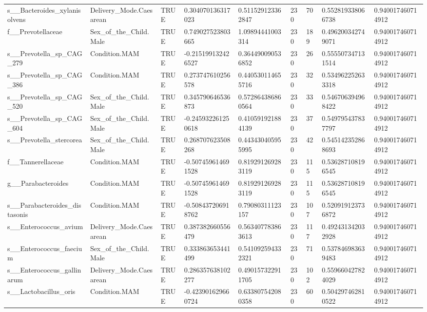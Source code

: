 \begin{longtable}{lllllllll}
s\_\_Bacteroides\_xylanisolvens & Delivery\_Mode.Caesarean & TRUE & 0.304070136317023 & 0.511529123362847 & 230 & 70 & 0.552819338066738 & 0.940017460714912 \\
f\_\_Prevotellaceae & Sex\_of\_the\_Child.Male & TRUE & 0.749027523803665 & 1.09894441003314 & 230 & 189 & 0.496200342749071 & 0.940017460714912 \\
s\_\_Prevotella\_sp\_CAG\_279 & Condition.MAM & TRUE & -0.215199132426527 & 0.364490090536852 & 230 & 26 & 0.555507347131514 & 0.940017460714912 \\
s\_\_Prevotella\_sp\_CAG\_386 & Condition.MAM & TRUE & 0.273747610256578 & 0.440530114655716 & 230 & 32 & 0.534962252633318 & 0.940017460714912 \\
s\_\_Prevotella\_sp\_CAG\_520 & Sex\_of\_the\_Child.Male & TRUE & 0.345790646536873 & 0.572864386860564 & 230 & 33 & 0.546706394968422 & 0.940017460714912 \\
s\_\_Prevotella\_sp\_CAG\_604 & Sex\_of\_the\_Child.Male & TRUE & -0.245932261250618 & 0.410591921884139 & 230 & 37 & 0.549795437837797 & 0.940017460714912 \\
s\_\_Prevotella\_stercorea & Sex\_of\_the\_Child.Male & TRUE & 0.268707623508268 & 0.443430405955995 & 230 & 42 & 0.545142352868693 & 0.940017460714912 \\
f\_\_Tannerellaceae & Condition.MAM & TRUE & -0.507459614691528 & 0.819291269283119 & 230 & 115 & 0.536287108196545 & 0.940017460714912 \\
g\_\_Parabacteroides & Condition.MAM & TRUE & -0.507459614691528 & 0.819291269283119 & 230 & 115 & 0.536287108196545 & 0.940017460714912 \\
s\_\_Parabacteroides\_distasonis & Condition.MAM & TRUE & -0.508437206918762 & 0.79080311123157 & 230 & 107 & 0.520919123736872 & 0.940017460714912 \\
s\_\_Enterococcus\_avium & Delivery\_Mode.Caesarean & TRUE & 0.387382660556479 & 0.563407783863613 & 230 & 117 & 0.492431342032928 & 0.940017460714912 \\
s\_\_Enterococcus\_faecium & Sex\_of\_the\_Child.Male & TRUE & 0.333863653441499 & 0.541092594332321 & 230 & 71 & 0.537846983639483 & 0.940017460714912 \\
s\_\_Enterococcus\_gallinarum & Delivery\_Mode.Caesarean & TRUE & 0.286357638102277 & 0.490157322911705 & 230 & 102 & 0.559660427824029 & 0.940017460714912 \\
s\_\_Lactobacillus\_oris & Condition.MAM & TRUE & -0.423901629660724 & 0.633807542080358 & 230 & 60 & 0.504297462810522 & 0.940017460714912 \\

\end{longtable}
